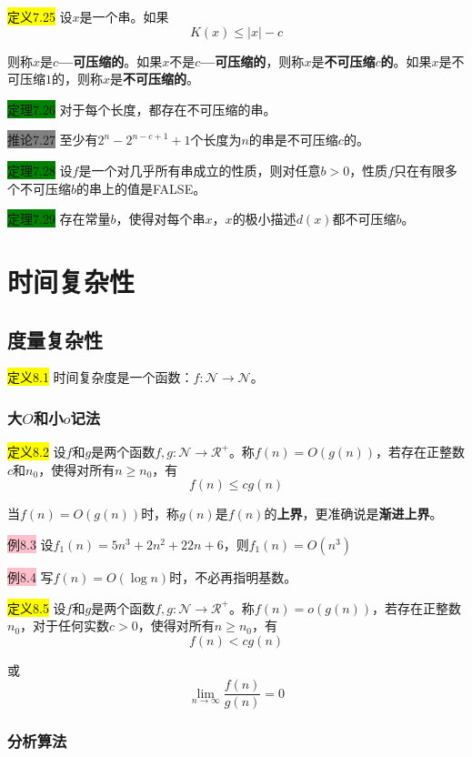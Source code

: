 \documentclass[a4paper]{article}
\begin{document}
	\colorbox{yellow}{定义7.25} 设$x$是一个串。如果
	$$K(x) \leq |x|-c$$
	
	则称$x$是\textbf{$c$—可压缩的}。如果$x$不是\textbf{$c$—可压缩的}，则称$x$是\textbf{不可压缩$c$的}。如果$x$是不可压缩$1$的，则称$x$是\textbf{不可压缩的}。
	
	\colorbox{green}{定理7.26} 对于每个长度，都存在不可压缩的串。
	
	\colorbox{gray}{推论7.27} 至少有$2^n-2^{n-c+1}+1$个长度为$n$的串是不可压缩$c$的。

	\colorbox{green}{定理7.28} 设$f$是一个对几乎所有串成立的性质，则对任意$b>0$，性质$f$只在有限多个不可压缩$b$的串上的值是FALSE。
	
	\colorbox{green}{定理7.29} 存在常量$b$，使得对每个串$x$，$x$的极小描述$d(x)$都不可压缩$b$。

\section{时间复杂性}

\subsection{度量复杂性}

	\colorbox{yellow}{定义8.1} 时间复杂度是一个函数：$f: \mathcal{N} \rightarrow \mathcal{N}$。
	
\subsubsection{大$O$和小$o$记法}

	\colorbox{yellow}{定义8.2} 设$f$和$g$是两个函数$f,g:\mathcal{N} \rightarrow \mathcal{R}^+$。称$f(n)=O(g(n))$，若存在正整数$c$和$n_0$，使得对所有$n\geq n_0$，有
	$$f(n)\leq cg(n)$$
	
	当$f(n)=O(g(n))$时，称$g(n)$是$f(n)$的\textbf{上界}，更准确说是\textbf{渐进上界}。
	
	\colorbox{pink}{例8.3} 设$f_1(n)=5n^3+2n^2+22n+6$，则$f_1(n)=O(n^3)$
	
	\colorbox{pink}{例8.4} 写$f(n)=O(\log{n})$时，不必再指明基数。
	
	\colorbox{yellow}{定义8.5} 设$f$和$g$是两个函数$f,g:\mathcal{N} \rightarrow \mathcal{R}^+$。称$f(n)=o(g(n))$，若存在正整数$n_0$，对于任何实数$c>0$，使得对所有$n\geq n_0$，有
	$$f(n) < cg(n)$$
	
	或
	$$\lim_{n \rightarrow \infty} \frac{f(n)}{g(n)}=0$$
	
\subsubsection{分析算法}
\end{document}
